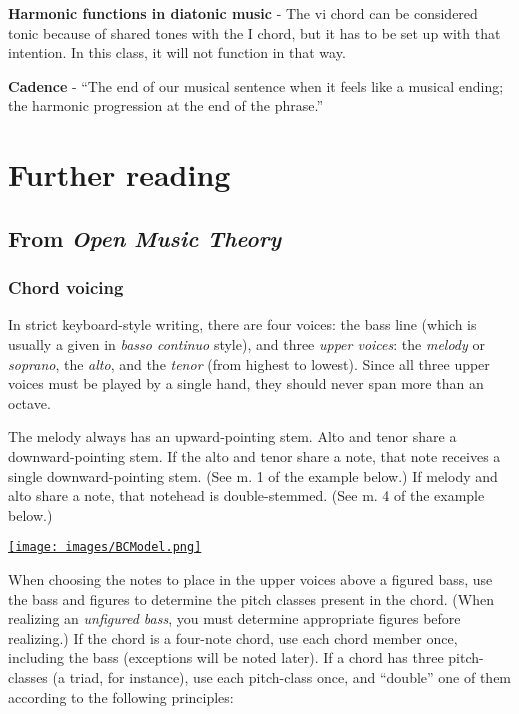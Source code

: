 \documentclass{book}
\begin{document}
\textbf{Harmonic functions in diatonic music} - The vi chord can be considered
tonic because of shared tones with the I chord, but it has to be set up with
that intention. In this class, it will not function in that way.

\textbf{Cadence} - ``The end of our musical sentence when it feels like a
musical ending; the harmonic progression at the end of the phrase.''

\hypertarget{further-reading-18}{%
\chapter{Further reading}\label{further-reading-18}}

\hypertarget{from-open-music-theory-18}{%
\section{\texorpdfstring{From \emph{Open Music
Theory}}{From Open Music Theory}}\label{from-open-music-theory-18}}

\hypertarget{chord-voicing-1}{%
\subsection{Chord voicing}\label{chord-voicing-1}}

In strict keyboard-style writing, there are four voices: the bass line (which
is usually a given in \emph{basso continuo} style), and three \emph{upper
voices}: the \emph{melody} or \emph{soprano}, the \emph{alto}, and the
\emph{tenor} (from highest to lowest). Since all three upper voices must be
played by a single hand, they should never span more than an octave.

The melody always has an upward-pointing stem. Alto and tenor share a
downward-pointing stem. If the alto and tenor share a note, that note receives
a single downward-pointing stem. (See m. 1 of the example below.) If melody
and alto share a note, that notehead is double-stemmed. (See m. 4 of the
example below.)

\href{images/BCModel.png}{\texttt{[image: images/BCModel.png]}}

When choosing the notes to place in the upper voices above a figured bass, use
the bass and figures to determine the pitch classes present in the chord.
(When realizing an \emph{unfigured bass}, you must determine appropriate
figures before realizing.) If the chord is a four-note chord, use each chord
member once, including the bass (exceptions will be noted later). If a chord
has three pitch-classes (a triad, for instance), use each pitch-class once,
and ``double'' one of them according to the following principles:
\end{document}
